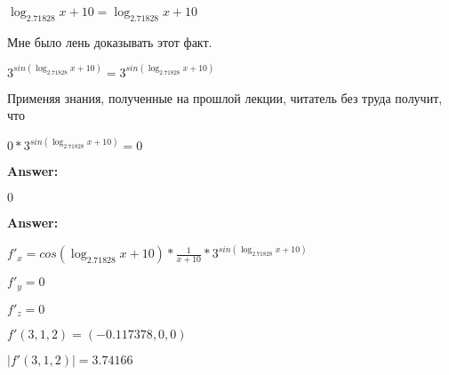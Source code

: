 \documentclass[12pt,a4paper,fleqn]{article}
\theoremstyle{definition}
\begin{document}
$\log_{ 2.71828 }{ x  +  10 } = \log_{ 2.71828 }{ x  +  10 }$

Мне было лень доказывать этот факт.

${ 3 }^{sin(\log_{ 2.71828 }{ x  +  10 })} = { 3 }^{sin(\log_{ 2.71828 }{ x  +  10 })}$

Применяя знания, полученные на прошлой лекции, читатель без труда получит, что 

$ 0  * { 3 }^{sin(\log_{ 2.71828 }{ x  +  10 })} =  0 $


\textbf{Answer:}

$ 0 $


\textbf{Answer:} 

$ f'_x = cos(\log_{ 2.71828 }{ x  +  10 }) * \frac{ 1 }{ x  +  10 }
 * { 3 }^{sin(\log_{ 2.71828 }{ x  +  10 })}$

$f'_y =  0 $

$f'_z =  0 $

$f'(3, 1, 2) = (-0.117378, 0, 0)$

$|f'(3, 1, 2)| = 3.74166$
\end{document}
